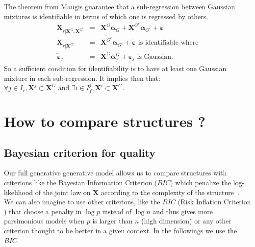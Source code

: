 \documentclass[12pt,a4paper]{report}
\begin{document}
The theorem from Maugis guarantee that a sub-regression between Gaussian mixtures is identifiable in terms of which one is regressed by others.
		\begin{eqnarray}
		 \boldsymbol{X}_{r|\boldsymbol{X}^G,\boldsymbol{X}^{G^c}}&=& \boldsymbol{X}^G\boldsymbol{\alpha}_G+\boldsymbol{X}^{G^c}\boldsymbol{\alpha}_{G^c}+ \boldsymbol{\varepsilon} \\
			\boldsymbol{X}_{r|\boldsymbol{X}^{G^c}}&=& \boldsymbol{X}^{G^c}\boldsymbol{\alpha}_{G^c} + \tilde{\boldsymbol{\varepsilon}} \textrm{ is identifiable where} \\
			\tilde{\boldsymbol{\varepsilon}}_j&=&\boldsymbol{X}^{G}\boldsymbol{\alpha}_j^{G}+ \boldsymbol{\varepsilon}_j \textrm{ is Gaussian.}  
		\end{eqnarray}
		So a sufficient condition for identifiability is to have at least one Gaussian mixture in each sub-regression.	
		It implies then that: $\forall j \in I_r, \boldsymbol{X}^{j} \subset \boldsymbol{X}^G \textrm{ and } \exists i \in I_f^j,\boldsymbol{X}^{i} \subset \boldsymbol{X}^G $.  
	


	\section{How to compare structures ?}
		\subsection{Bayesian criterion for quality}
		Our full generative generative model allows us to compare structures with criterions like the Bayesian Information Criterion ($BIC$) which penalize the log-likelihood of the joint law on $\boldsymbol{X}$ according to the complexity of the structure~\cite{BIChuard}. \\
			 We can also imagine to use other criterions, like the $RIC$ (Risk Inflation Criterion \cite{foster1994risk}) that choose a penalty in $\log p$ instead of $\log n$ and thus gives more parsimonious models when $p$ is larger than $n$ (high dimension) or any other criterion \cite{george1993variable} thought to be better in a given context.
		In the followings we use the $BIC$.	
\end{document}
